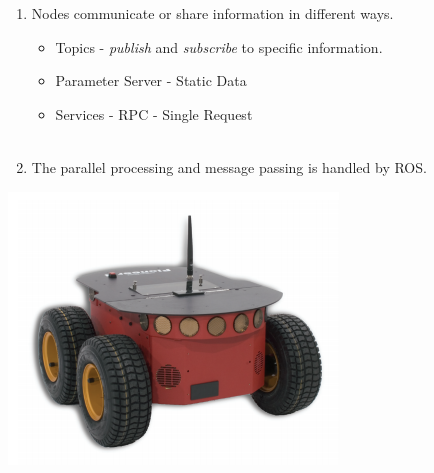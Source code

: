 \documentclass[12pt]{article}
\begin{document}
\begin{description}
\begin{enumerate}
                \item Nodes communicate or share information in  different ways. 
                 \begin{itemize}
                        \item Topics - {\it publish} and {\it subscribe} to specific information.
                        \item Parameter Server - Static Data
                        \item Services - RPC - Single Request \\\\
                    \end{itemize} 
                
                \item The parallel processing and message passing is handled by ROS. 
            \end{enumerate}    
         
                \includegraphics[scale=1]{p3at.PNG}
            


\end{description}
\end{document}
